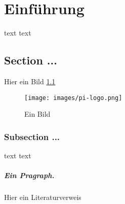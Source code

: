 \chapter{Einführung}
\label{einfuehrung}

text text

\section{Section ...}
\label{setAssNav-example}

Hier ein Bild \ref{fig:bild}

\begin{figure}[htbp]
  \centering
  \texttt{[image: images/pi-logo.png]}
  \caption{Ein Bild}
  \label{fig:bild}
\end{figure}


\subsection{Subsection ...}

text text

\paragraph{Ein Pragraph.}
Hier ein Literaturverweis \cite{Arendt2010}